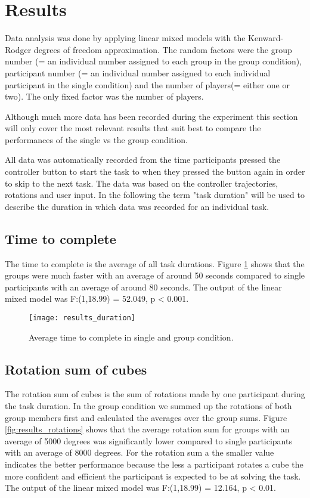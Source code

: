 \section{Results}
Data analysis was done by applying linear mixed models with the Kenward-Rodger degrees of freedom approximation. The random factors were the group number (= an individual number assigned to each group in the group condition), participant number (= an individual number assigned to each individual participant in the single condition) and the number of players(= either one or two). The only fixed factor was the number of players. 

 Although much more data has been recorded during the experiment this section will only cover the most relevant results that suit best to compare the performances of the single vs the group condition. 
 
 All data was automatically recorded from the time participants pressed the controller button to start the task to when they pressed the button again in order to skip to the next task. The data was based on the controller trajectories, rotations and user input.  In the following the term "task duration" will be used to describe the duration in which data was recorded for an individual task.

\subsection{Time to complete}
The time to complete is the average of all task durations.  Figure \ref{fig:results_duration} shows that the groups were much faster with an average of around 50 seconds compared to single participants with an average of around 80 seconds. The output of the linear mixed model was F:(1,18.99) = 52.049, p < 0.001.

\begin{figure}[h]
\centering
\texttt{[image: results\_duration]}
\caption{Average time to complete in single and group condition.} \label{fig:results_duration}
\end{figure}

\subsection{Rotation sum of cubes}
The rotation sum of cubes is the sum of rotations made by one participant during the task duration. In the group condition we summed up the rotations of both group members first and calculated the averages over the group sums. Figure \ref{fig:results_rotations} shows that the average rotation sum for groups with an average of 5000 degrees was significantly lower compared to single participants with an average of 8000 degrees. For the rotation sum a the smaller value indicates the better performance because the less a participant rotates a cube the more confident and efficient the participant is expected to be at solving the task. The output of the linear mixed model was F:(1,18.99) = 12.164, p < 0.01.

